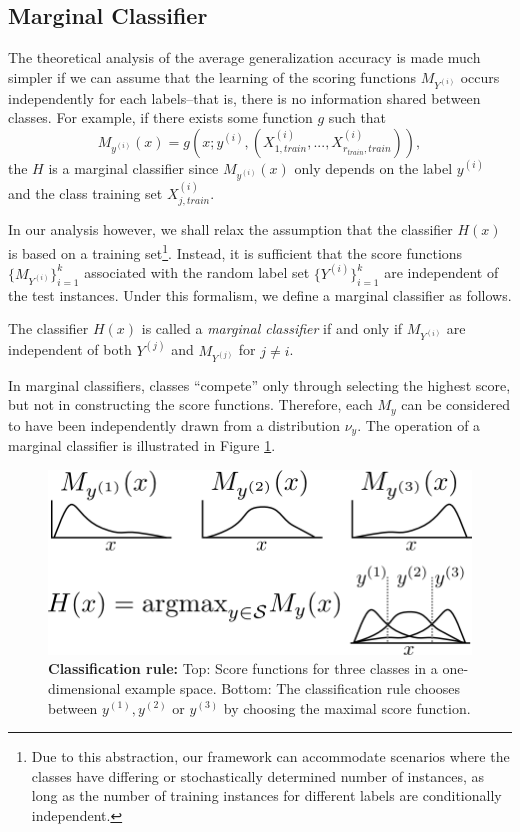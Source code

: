 \documentclass[twoside,11pt]{article}
\begin{document}
\subsection{Marginal Classifier}

The theoretical analysis of the average generalization accuracy is made much simpler
if we can assume that the learning of the scoring functions $M_{Y^{(i)}}$ occurs independently
for each labels--that is, there is no information shared between classes.
For example, if there exists some function $g$ such that
\[M_{y^{(i)}}(x) = g(x; y^{(i)},(X_{1, train}^{(i)},...,X_{r_{train}, train}^{(i)})),\]
the $H$ is a marginal classifier
since $M_{y^{(i)}}(x)$ only depends on the label $y^{(i)}$
and the class training set $X_{j, train}^{(i)}$.

In our analysis however, we shall relax the assumption that the classifier $H(x)$ is based on a training set\footnote{Due to this abstraction,
our framework can accommodate scenarios where the classes have differing or stochastically determined number of instances, as long as the number of training instances for different labels are conditionally independent.}.  Instead, it is sufficient
that the score functions $\{M_{Y^{(i)}}\}_{i=1}^k$ associated with the random label set $\{Y^{(i)}\}_{i=1}^k$ are independent of the test instances.  Under this formalism, we define a marginal classifier as follows.
\begin{definition}
The classifier $H(x)$ is called a \emph{marginal classifier} if and only if $M_{Y^{(i)}}$ are
independent of both $Y^{(j)}$ and $M_{Y^{(j)}}$ for $j \neq i$.
\end{definition}

In marginal classifiers, classes ``compete'' only through selecting the highest
score, but not in constructing the score functions.
Therefore, each
$M_y$ can be considered to have been independently drawn from a distribution
$\nu_y$.
The operation of
a marginal classifier is illustrated in Figure
\ref{fig:classification_rule}.

\begin{figure}[t]
\centering
\includegraphics[scale = 0.4]{classification_rule.png}
\caption{\textbf{Classification rule:} Top: Score functions for three classes in a one-dimensional example space. Bottom: The classification rule chooses between $y^{(1)},y^{(2)}$ or $y^{(3)}$ by choosing the maximal score function.
}
\label{fig:classification_rule}
\end{figure}
\end{document}
